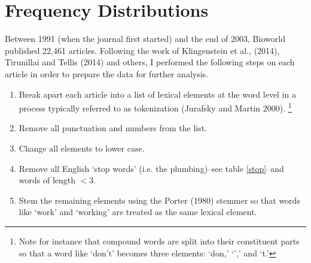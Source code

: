 \section{Frequency Distributions}

Between 1991 (when the journal first started) and the end of 2003, Bioworld published 22,461 articles. Following the work of Klingenstein et al., (2014), Tirunillai and Tellis (2014) and others, I performed the following steps on each article in order to prepare the data for further analysis.
\begin{enumerate}
  \item Break apart each article into a list of lexical elements at the word level in a process typically referred to as tokenization (Jurafsky and Martin 2000). \footnote{Note for instance that compound words are split into their constituent parts so that a word like `don't' becomes three elements: `don,' `',' and `t.'}
  \item Remove all punctuation and numbers from the list.
  \item Change all elements to lower case.
  \item Remove all English `stop words' (i.e. the plumbing)--see table \ref{stop}--and words of length $< 3$.
  \item Stem the remaining elements using the Porter (1980) stemmer so that words like `work' and `working' are treated as the same lexical element.
\end{enumerate}

